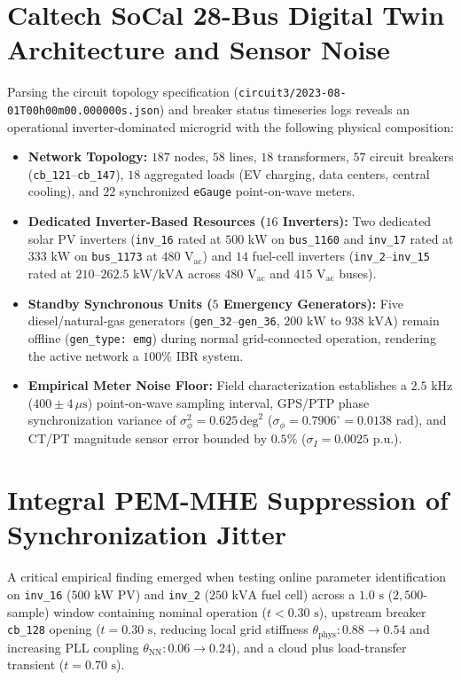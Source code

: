 \documentclass[journal]{IEEEtran}
\begin{document}
\section{Caltech SoCal 28-Bus Digital Twin Architecture and Sensor Noise}
Parsing the circuit topology specification (\texttt{circuit3/2023-08-01T00h00m00.000000s.json}) and breaker status timeseries logs reveals an operational inverter-dominated microgrid with the following physical composition:
\begin{itemize}
    \item \textbf{Network Topology:} $187$ nodes, $58$ lines, $18$ transformers, $57$ circuit breakers (\texttt{cb\_121}--\texttt{cb\_147}), $18$ aggregated loads (EV charging, data centers, central cooling), and $22$ synchronized \texttt{eGauge} point-on-wave meters.
    \item \textbf{Dedicated Inverter-Based Resources ($16$ Inverters):} Two dedicated solar PV inverters (\texttt{inv\_16} rated at $500\text{ kW}$ on \texttt{bus\_1160} and \texttt{inv\_17} rated at $333\text{ kW}$ on \texttt{bus\_1173} at $480\text{ V}_{\text{ac}}$) and $14$ fuel-cell inverters (\texttt{inv\_2}--\texttt{inv\_15} rated at $210$--$262.5\text{ kW/kVA}$ across $480\text{ V}_{\text{ac}}$ and $415\text{ V}_{\text{ac}}$ buses).
    \item \textbf{Standby Synchronous Units ($5$ Emergency Generators):} Five diesel/natural-gas generators (\texttt{gen\_32}--\texttt{gen\_36}, $200\text{ kW}$ to $938\text{ kVA}$) remain offline (\texttt{gen\_type: emg}) during normal grid-connected operation, rendering the active network a $100\%$ IBR system.
    \item \textbf{Empirical Meter Noise Floor:} Field characterization establishes a $2.5\text{ kHz}$ ($400 \pm 4\,\mu\text{s}$) point-on-wave sampling interval, GPS/PTP phase synchronization variance of $\sigma_\phi^2 = 0.625\,\text{deg}^2$ ($\sigma_\phi = 0.7906^\circ = 0.0138\text{ rad}$), and CT/PT magnitude sensor error bounded by $0.5\%$ ($\sigma_I = 0.0025\text{ p.u.}$).
\end{itemize}

\section{Integral PEM-MHE Suppression of Synchronization Jitter}
A critical empirical finding emerged when testing online parameter identification on \texttt{inv\_16} ($500\text{ kW}$ PV) and \texttt{inv\_2} ($250\text{ kVA}$ fuel cell) across a $1.0\text{ s}$ ($2{,}500$-sample) window containing nominal operation ($t < 0.30\text{ s}$), upstream breaker \texttt{cb\_128} opening ($t = 0.30\text{ s}$, reducing local grid stiffness $\theta_{\text{phys}}: 0.88 \to 0.54$ and increasing PLL coupling $\theta_{\text{NN}}: 0.06 \to 0.24$), and a cloud plus load-transfer transient ($t = 0.70\text{ s}$).
\end{document}
